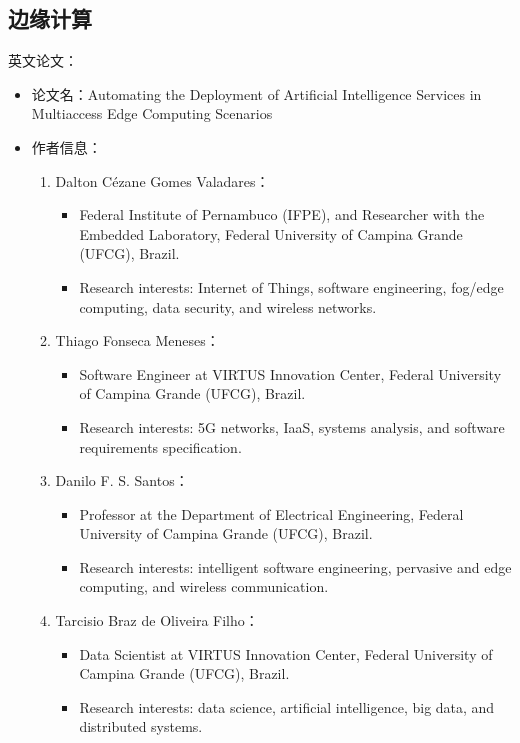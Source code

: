 \subsection{边缘计算}

英文论文：
\begin{itemize}
    \item 论文名：Automating the Deployment of Artificial Intelligence Services in Multiaccess Edge Computing Scenarios
    \item 作者信息：
            \begin{enumerate}
                \item Dalton Cézane Gomes Valadares：
                    \begin{itemize}
                        \item Federal Institute of Pernambuco (IFPE), and Researcher with the Embedded Laboratory, Federal University of Campina Grande (UFCG), Brazil.  
                        \item Research interests: Internet of Things, software engineering, fog/edge computing, data security, and wireless networks.
                    \end{itemize}

                \item Thiago Fonseca Meneses：
                    \begin{itemize}
                        \item Software Engineer at VIRTUS Innovation Center, Federal University of Campina Grande (UFCG), Brazil.  
                        \item Research interests: 5G networks, IaaS, systems analysis, and software requirements specification.
                    \end{itemize}

                \item Danilo F. S. Santos：
                    \begin{itemize}
                        \item Professor at the Department of Electrical Engineering, Federal University of Campina Grande (UFCG), Brazil.  
                        \item Research interests: intelligent software engineering, pervasive and edge computing, and wireless communication.
                    \end{itemize}

                \item Tarcisio Braz de Oliveira Filho：
                    \begin{itemize}
                        \item Data Scientist at VIRTUS Innovation Center, Federal University of Campina Grande (UFCG), Brazil.  
                        \item Research interests: data science, artificial intelligence, big data, and distributed systems.
                    \end{itemize}


\end{enumerate}
\end{itemize}
